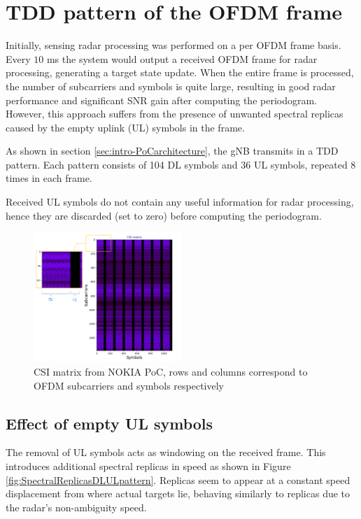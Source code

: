 \chapter{TDD pattern of the OFDM frame}
\label{chap:TDD pattern of the OFDM frame}


Initially, sensing radar processing was performed on a per OFDM frame basis. \protect\newline Every $10$ ms the system would output a received OFDM frame for radar processing, generating a target state update. When the entire frame is processed, the number of subcarriers and symbols is quite large, resulting in good radar performance and significant SNR gain after computing the periodogram. However, this approach suffers from the presence of unwanted spectral replicas caused by the empty uplink (UL) symbols in the frame.
    
As shown in section \ref{sec:intro-PoCarchitecture}, the gNB transmits in a TDD pattern. Each pattern consists of 104 DL symbols and 36 UL symbols, repeated 8 times in each frame.

Received UL symbols do not contain any useful information for radar processing, hence they are discarded (set to zero) before computing the periodogram.

\begin{figure}[H]
    \centering
    \includegraphics[width=0.5\textwidth]{Images/TDDprocessing/CSIMatrix_DLULpattern.png}
    \caption{CSI matrix from NOKIA PoC, rows and columns correspond to OFDM subcarriers and symbols respectively}
    \label{fig:CSIMatrix_DLULpattern}
\end{figure}

\section{Effect of empty UL symbols}
    
    The removal of UL symbols acts as windowing on the received frame. This introduces additional spectral replicas in speed as shown in Figure \ref{fig:SpectralReplicasDLULpattern}. Replicas seem to appear at a constant speed displacement from where actual targets lie, behaving similarly to replicas due to the radar's non-ambiguity speed.
    
